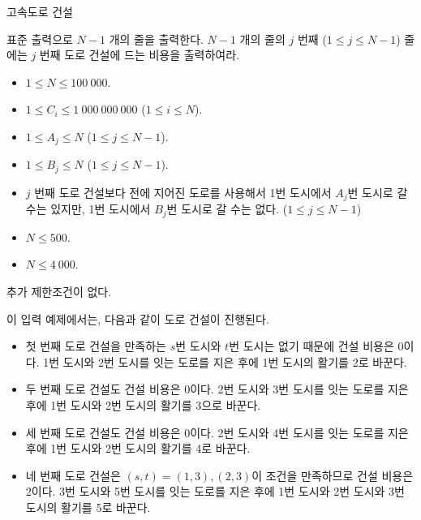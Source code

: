 \begin{problem}{고속도로 건설}
	\OutputFile
	
	표준 출력으로 $N-1$ 개의 줄을 출력한다. $N-1$ 개의 줄의 $j$ 번째 ($1 \le j \le N-1$) 줄에는 $j$ 번째 도로 건설에 드는 비용을 출력하여라.
	
	\Constraints
	
	\begin{itemize}
		\item $1 \le N \le 100\ 000$.
		\item $1 \le C_i \le 1\ 000\ 000\ 000$ ($1 \le i \le N$).
		\item $1 \le A_j \le N$ ($1 \le j \le N-1$).
		\item $1 \le B_j \le N$ ($1 \le j \le N-1$).
		\item $j$ 번째 도로 건설보다 전에 지어진 도로를 사용해서 1번 도시에서 $A_j$번 도시로 갈 수는 있지만, 1번 도시에서 $B_j$번 도시로 갈 수는 없다. ($1 \le j \le N-1$)
	\end{itemize}
	
	
	\begin{itemize}
		\item $N \le 500$.
	\end{itemize}

	\begin{itemize}
		\item $N \le 4\ 000$.
	\end{itemize}
	

	추가 제한조건이 없다.
	
	\Examples
	
	\begin{example}
	\end{example}
	
	이 입력 예제에서는, 다음과 같이 도로 건설이 진행된다.
	
	\begin{itemize}
		\item 첫 번째 도로 건설을 만족하는 $s$번 도시와 $t$번 도시는 없기 때문에 건설 비용은 0이다. 1번 도시와 2번 도시를 잇는 도로를 지은 후에 1번 도시의 활기를 2로 바꾼다.
		\item 두 번째 도로 건설도 건설 비용은 0이다. 2번 도시와 3번 도시를 잇는 도로를 지은 후에 1번 도시와 2번 도시의 활기를 3으로 바꾼다.
		\item 세 번째 도로 건설도 건설 비용은 0이다. 2번 도시와 4번 도시를 잇는 도로를 지은 후에 1번 도시와 2번 도시의 활기를 4로 바꾼다.
		\item 네 번째 도로 건설은 $(s, t) = (1, 3), (2, 3)$이 조건을 만족하므로 건설 비용은 2이다. 3번 도시와 5번 도시를 잇는 도로를 지은 후에 1번 도시와 2번 도시와 3번 도시의 활기를 5로 바꾼다.
	\end{itemize}
	
	\begin{example}
	\end{example}
	
	
\end{problem}

